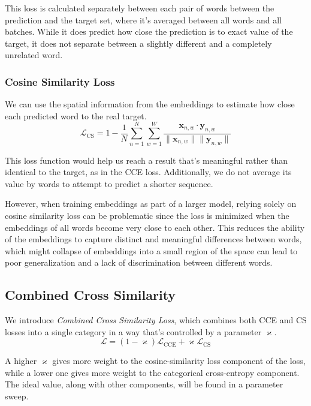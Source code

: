 This loss is calculated separately between each pair of words between the prediction and the target set, where it's averaged between all words and all batches.
While it does predict how close the prediction is to exact value of the target, it does not separate between a slightly different and a completely unrelated word.

\subsubsection{Cosine Similarity Loss}
\label{cosine_similarity_loss}

We can use the spatial information from the embeddings to estimate how close each predicted word to the real target\cite{cosineSimilarity}.
\begin{equation}
	\mathcal{L}_\text{CS} = 1 - \frac{1}{N} \sum_{n=1}^{N} \sum^W_{w = 1} \frac{\mathbf{x}_{n,w} \cdot \mathbf{y}_{n,w}}{\|\mathbf{x}_{n,w}\| \|\mathbf{y}_{n, w}\|}	
\end{equation}

This loss function would help us reach a result that's meaningful rather than identical to the target, as in the CCE loss.
Additionally, we do not average its value by words to attempt to predict a shorter sequence.

However, when training embeddings as part of a larger model, relying solely on cosine similarity loss can be problematic since the loss is minimized when the embeddings of all words become very close to each other.
This reduces the ability of the embeddings to capture distinct and meaningful differences between words, which might collapse of embeddings into a small region of the space can lead to poor generalization and a lack of discrimination between different words.

\subsection{Combined Cross Similarity}
We introduce \emph{Combined Cross Similarity Loss}, which combines both CCE and CS losses into a single category in a way that's controlled by a parameter $\varkappa$.
\begin{equation}
    \mathcal{L} = (1 - \varkappa) \mathcal{L}_{\text{CCE}} + \varkappa \mathcal{L}_{\text{CS}}
\end{equation}

A higher $\varkappa$ gives more weight to the cosine-similarity loss component of the loss, while a lower one gives more weight to the categorical cross-entropy component.
The ideal value, along with other components, will be found in a parameter sweep.

